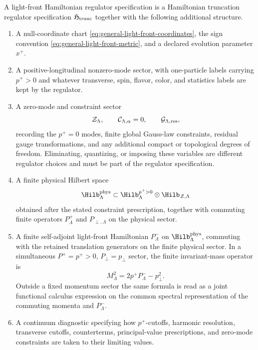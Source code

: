 \begin{definition}
\label{def:light-front-hamiltonian-regulator-datum}
A light-front Hamiltonian regulator specification is a Hamiltonian truncation
regulator specification
\(\mathfrak H_{\rm trunc}\) together with the following additional
structure.
\begin{enumerate}[label=\textnormal{(\roman*)}]
\item A null-coordinate chart \eqref{eq:general-light-front-coordinates},
  the sign convention \eqref{eq:general-light-front-metric}, and a declared
  evolution parameter \(x^+\).
\item A positive-longitudinal nonzero-mode sector, with one-particle labels
  carrying \(p^+>0\) and whatever transverse, spin, flavor, color, and
  statistics labels are kept by the regulator.
\item A zero-mode and constraint sector
  \[
    \mathcal Z_\Lambda,\qquad
    \mathcal C_{\Lambda,\alpha}=0,\qquad
    \mathcal G_{\Lambda,\rm res},
  \]
  recording the \(p^+=0\) modes, finite global Gauss-law constraints,
  residual gauge transformations, and any additional compact or topological
  degrees of freedom.  Eliminating, quantizing, or imposing these variables
  are different regulator choices and must be part of the regulator
  specification.
\item A finite physical Hilbert space
  \[
    \Hilb^{\rm phys}_\Lambda
    \subset
    \Hilb^{p^+>0}_\Lambda\otimes\Hilb_{\mathcal Z,\Lambda}
  \]
  obtained after the stated constraint prescription, together with commuting
  finite operators \(P^+_\Lambda\) and \(P_{\perp,\Lambda}\) on the physical
  sector.
\item A finite self-adjoint light-front Hamiltonian \(P^-_\Lambda\) on
  \(\Hilb^{\rm phys}_\Lambda\), commuting with the retained translation
  generators on the finite physical sector.  In a simultaneous
  \(P^+=p^+>0\), \(P_\perp=p_\perp\) sector, the finite invariant-mass
  operator is
  \begin{equation}
    M_\Lambda^2
    =
    2p^+P^-_\Lambda-p_\perp^2.
    \label{eq:light-front-mass-operator-fixed-sector}
  \end{equation}
  Outside a fixed momentum sector the same formula is read as a joint
  functional calculus expression on the common spectral representation of the
  commuting momenta and \(P^-_\Lambda\).
\item A continuum diagnostic specifying how \(p^+\)-cutoffs, harmonic
  resolution, transverse cutoffs, counterterms, principal-value
  prescriptions, and zero-mode constraints are taken to their limiting
  values.
\end{enumerate}
\end{definition}

